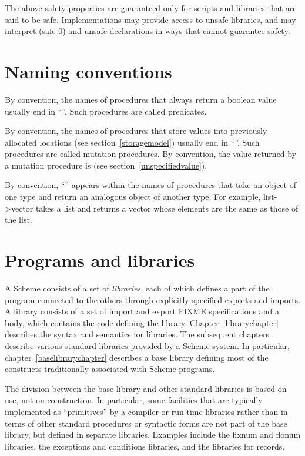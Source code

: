 The above safety properties are guaranteed only for scripts
and libraries that are said to be safe.  Implementations
may provide access to unsafe libraries, and may interpret
{\cf (safe 0)} and {\cf unsafe} declarations in ways that
cannot guarantee safety.

\section{Naming conventions}

By convention, the names of procedures that always return a boolean
value usually end
in ``''.  Such procedures are called predicates.

By convention, the names of procedures that store values into previously
allocated locations (see section~\ref{storagemodel}) usually end in
``\ide{!}''.
Such procedures are called mutation procedures.
By convention, the value returned by a mutation procedure is
\unspecifiedreturn{} (see section~\ref{unspecifiedvalue}).

By convention, ``\ide{->}'' appears within the names of procedures that
take an object of one type and return an analogous object of another type.
For example, {\cf list->vector} takes a list and returns a vector whose
elements are the same as those of the list.


	

\section{Programs and libraries}

A Scheme consists of a set of \textit{libraries}, each
of which defines a part of the program connected to the others through
explicitly specified exports and imports.  A library consists of a set
of import and export FIXME specifications and a body, which contains
the code defining the library.  Chapter~\ref{librarychapter} describes
the syntax and semantics for libraries.  The subsequent chapters
describe various standard libraries provided by a Scheme system.  In
particular, chapter~\ref{baselibrarychapter} describes a base
library defining most of the constructs traditionally associated with
Scheme programs.

The division between the base library and other standard libraries is
based on use, not on construction.  In particular, some facilities
that are typically implemented as ``primitives'' by a compiler or
run-time libraries rather than in terms of other standard procedures
 or syntactic forms are not part of the base library, but defined in
separate libraries.  Examples include the fixnum and flonum libraries,
the exceptions and conditions libraries, and the libraries for
records.


